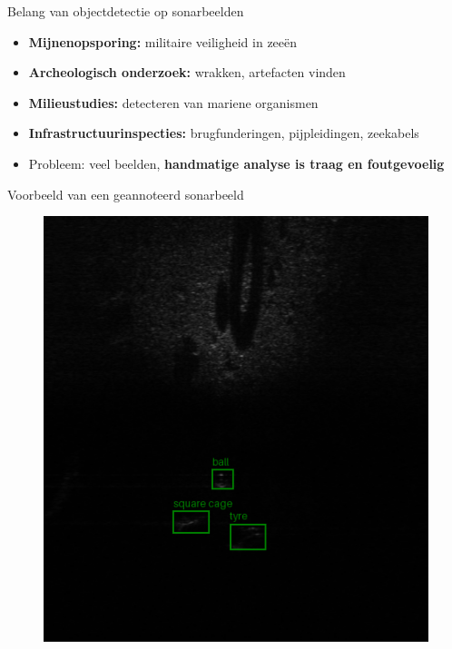\documentclass[aspectratio=169]{beamer}
\begin{document}
    \begin{frame}{Belang van objectdetectie op sonarbeelden}
        \begin{itemize}
            \item \textbf{Mijnenopsporing:} militaire veiligheid in zeeën
            \item \textbf{Archeologisch onderzoek:} wrakken, artefacten vinden
            \item \textbf{Milieustudies:} detecteren van mariene organismen
            \item \textbf{Infrastructuurinspecties:} brugfunderingen, pijpleidingen, zeekabels
        \end{itemize}
        \begin{itemize}
            \item Probleem: veel beelden, \textbf{handmatige analyse is traag en foutgevoelig}
        \end{itemize}
    \end{frame}
    
    \begin{frame}{Voorbeeld van een geannoteerd sonarbeeld}
        \begin{figure}
            \centering
            \includegraphics[height=0.9\textheight]{8_gt.png}
        \end{figure}
    \end{frame}
    
\end{document}
